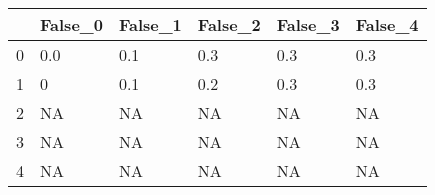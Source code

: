\begin{tabular}{llllll}
\toprule
{} & False\_0 & False\_1 & False\_2 & False\_3 & False\_4 \\ \hline
\midrule
0 &     0.0 &     0.1 &     0.3 &     0.3 &     0.3 \\ \hline
1 &       0 &     0.1 &     0.2 &     0.3 &     0.3 \\ \hline
2 &      NA &      NA &      NA &      NA &      NA \\ \hline
3 &      NA &      NA &      NA &      NA &      NA \\ \hline
4 &      NA &      NA &      NA &      NA &      NA \\ \hline
\bottomrule
\end{tabular}
